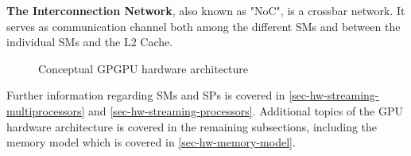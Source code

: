 \textbf{The Interconnection Network}, also known as "NoC", is a crossbar network.
It serves as communication channel both among the different SMs and between the individual SMs and the L2 Cache.




\begin{figure}[ht]
	\centering
	\caption{Conceptual GPGPU hardware architecture}
	\label{fig:hw-gpu}
\end{figure}

Further information regarding SMs and SPs is covered in \cref{sec-hw-streaming-multiprocessors} and \cref{sec-hw-streaming-processors}.
Additional topics of the GPU hardware architecture is covered in the remaining subsections, including the memory model which is covered in \cref{sec-hw-memory-model}.